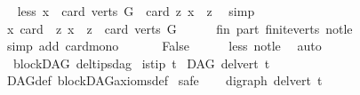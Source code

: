 \begin{isabellebody}
\ \isamarkupfalse%
\ less{\isacharcolon}{\kern0pt}\ {\isachardoublequoteopen}{\isasymexists}x{\isachardot}{\kern0pt}\ \ card\ {\isacharparenleft}{\kern0pt}verts\ G{\isacharparenright}{\kern0pt}\ {\isacharless}{\kern0pt}\ card\ {\isacharbraceleft}{\kern0pt}z{\isachardot}{\kern0pt}\ x\ {\isasymrightarrow}\isactrlsup {\isacharplus}{\kern0pt}\ z{\isacharbraceright}{\kern0pt}{\isachardoublequoteclose}\ \isamarkupfalse%
\ simp\isanewline
\ \ \isamarkupfalse%
\isanewline
\ \ \isamarkupfalse%
\ {\isachardoublequoteopen}{\isasymforall}x{\isachardot}{\kern0pt}\ card\ \ {\isacharbraceleft}{\kern0pt}z{\isachardot}{\kern0pt}\ x\ {\isasymrightarrow}\isactrlsup {\isacharplus}{\kern0pt}\ z{\isacharbraceright}{\kern0pt}\ {\isasymle}\ card\ {\isacharparenleft}{\kern0pt}verts\ G{\isacharparenright}{\kern0pt}{\isachardoublequoteclose}\isanewline
\ \ \ \ \isamarkupfalse%
\ fin\ part\ finite{\isacharunderscore}{\kern0pt}verts\ not{\isacharunderscore}{\kern0pt}le\isanewline
\ \ \ \ \isamarkupfalse%
\ {\isacharparenleft}{\kern0pt}simp\ add{\isacharcolon}{\kern0pt}\ card{\isacharunderscore}{\kern0pt}mono{\isacharparenright}{\kern0pt}\ \isanewline
\ \ \isamarkupfalse%
\ \isamarkupfalse%
\ False\isanewline
\ \ \ \ \isamarkupfalse%
\ less\ not{\isacharunderscore}{\kern0pt}le\ \isamarkupfalse%
\ auto\isanewline
{}\isamarkupfalse%
%
\endisatagproof
{\isafoldproof}%
%
\isadelimproof
\isanewline
%
\endisadelimproof
\isanewline
{}\isamarkupfalse%
\ {\isacharparenleft}{\kern0pt}\ blockDAG{\isacharparenright}{\kern0pt}\ del{\isacharunderscore}{\kern0pt}tips{\isacharunderscore}{\kern0pt}dag{\isacharcolon}{\kern0pt}\isanewline
{}\ {\isachardoublequoteopen}is{\isacharunderscore}{\kern0pt}tip\ t{\isachardoublequoteclose}\isanewline
{}\ {\isachardoublequoteopen}DAG\ {\isacharparenleft}{\kern0pt}del{\isacharunderscore}{\kern0pt}vert\ t{\isacharparenright}{\kern0pt}{\isachardoublequoteclose}\isanewline
%
\isadelimproof
\ \ %
\endisadelimproof
%
\isatagproof
{}\isamarkupfalse%
\ DAG{\isacharunderscore}{\kern0pt}def\ blockDAG{\isacharunderscore}{\kern0pt}axioms{\isacharunderscore}{\kern0pt}def\isanewline
{}\isamarkupfalse%
\ safe\isanewline
\ \ \isamarkupfalse%
\ {\isachardoublequoteopen}digraph\ {\isacharparenleft}{\kern0pt}del{\isacharunderscore}{\kern0pt}vert\ t{\isacharparenright}{\kern0pt}{\isachardoublequoteclose}\ \isamarkupfalse%

\end{isabellebody}
